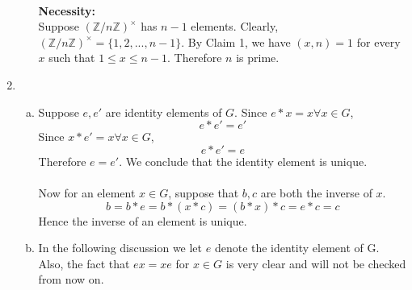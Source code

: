 \documentclass[A4paper,12pt]{article}
\theoremstyle{definition}
\numberwithin{equation}{section}
\begin{document}
\begin{enumerate}[1)]
\begin{enumerate}[(a)]
                \\
                \textbf{Necessity:}\\
                Suppose $(\mathbb{Z}/n\mathbb{Z})^{\times}$ has $n-1$ elements. 
                Clearly, $(\mathbb{Z}/n\mathbb{Z})^{\times} = \{1, 2, ..., n-1\}$.
                By Claim 1, we have $(x, n)=1$ for every $x$ such that $1 \leq x \leq n-1$. 
                Therefore $n$ is prime.
        \end{enumerate}
    \item
        \begin{enumerate}[(a)]
            \item
                Suppose $e, e'$ are identity elements of $G$. 
                Since $e * x = x \forall x \in G$,
                $$e*e' = e'$$
                Since $x*e' = x \forall x \in G$,
                $$e*e' = e$$
                Therefore $e = e'$.
                We conclude that the identity element is unique.\\\\
                Now for an element $x \in G$, suppose that $b, c$ are both the inverse of $x$.
                $$b = b*e = b*(x*c) = (b*x)*c = e*c = c$$
                Hence the inverse of an element is unique.
            \item
                In the following discussion we let $e$ denote the identity element of G. Also, the fact that $ex = xe$ for $x\in G$ is very clear and will not be checked from now on.\\
                

\end{enumerate}
\end{enumerate}
\end{document}
